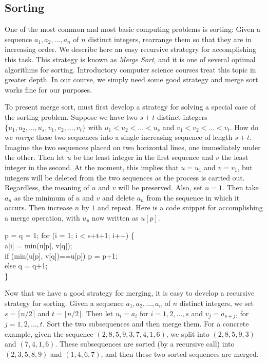 \subsection{Sorting}

One of the most common and most basic computing problems is sorting:
Given a sequence $a_1,a_2,\dots,a_n$ of $n$ distinct integers,
rearrange them so that they are in increasing order.  We describe
here an easy recursive strategry for accomplishing this task.  This
strategy is known as \textit{Merge Sort}, and it is one of several
optimal algorithms for sorting.  Introductory computer science
courses treat this topic in greater depth.  In our course, we simply
need some good strategy and merge sort works fine for our purposes.

To present merge sort, must first develop a strategy for solving a 
special case of the sorting problem.
Suppose we have two $s+t$ distinct integers
$\{u_1,u_2,\dots,u_s,v_1,v_2,\dots,v_t\}$ with $u_1<u_2<\dots<u_s$
and $v_1<v_2<\dots<v_t$.  How do we \textit{merge} these two sequences
into a single increasing sequence of length $s+t$.
Imagine the two sequences placed on two horizontal lines, one immediately
under the other.  Then let $u$ be the least integer in the first
sequence and $v$ the least integer in the second.  At the moment,
this implies that $u=u_1$ and $v=v_1$, but integers will be deleted 
from the two sequences as the process is carried out.  Regardless, the 
meaning of $u$ and $v$ will be preserved.   Also, set $n=1$.
Then take $a_n$ as the minimum of $u$ and $v$ and delete $a_n$ from
the sequence in which it occurs.  Then increase $n$ by $1$ and
repeat.  Here is a code snippet for accomplishing a merge operation,
with $u_p$ now written as $u[p]$.  

\medskip
\begin{tt}
\noindent
p = q = 1;
for (i = 1; i < s+t+1; i++) \{\\
a[i] = min(u[p], v[q]);\\
if (min(u[p], v[q])==u[p]) p = p+1;\\
\quad  else q = q+1;\\
\}\\
\end{tt}

Now that we have a good strategy for merging, it is easy to
develop a recursive strategy for sorting.  Given a sequence
$a_1,a_2,\dots,a_n$ of $n$ distinct integers, we set $s=\lceil n/2\rceil$
and $t=\lfloor n/2\rfloor$.  Then let $u_i=a_i$ for $i=1,2,\dots,s$ and
$v_j=a_{s+j}$, for $j=1,2,\dots,t$.  Sort the two subsequences
and then merge them.  For a concrete example, given the
sequence $(2,8,5,9,3,7,4,1,6)$, we split into $(2,8,5,9,3)$ and
$(7,4,1,6)$.  These subsequences are sorted (by a recursive call)
into $(2,3,5,8,9)$ and $(1,4,6,7)$, and then these two sorted
sequences are merged.


